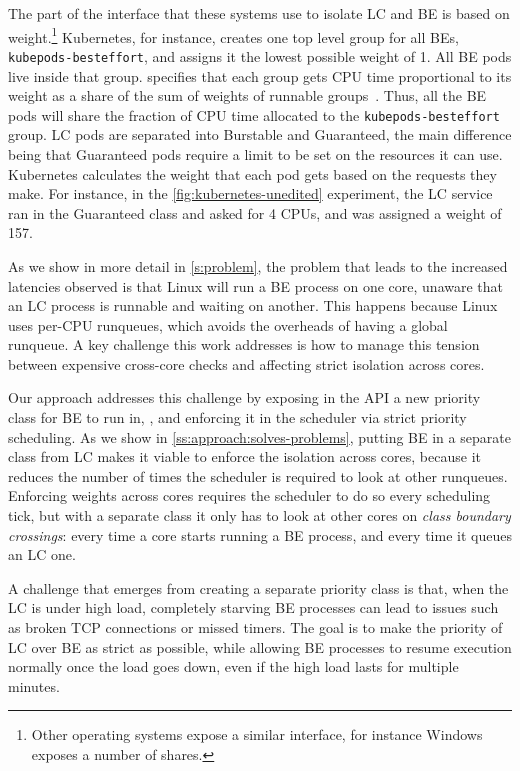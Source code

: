 The part of the \cgroups{} interface that these systems use to isolate LC and BE
is based on weight.\footnote{Other operating systems expose a similar interface,
for instance Windows exposes a number of shares.} Kubernetes, for instance,
creates one top level group for all BEs, \texttt{kubepods-besteffort}, and
assigns it the lowest possible weight of 1. All BE pods live inside that group.
\cgroups{} specifies that each group gets CPU time proportional to its weight as
a share of the sum of weights of runnable groups~\cite{cgroups-kerneldocs}.
Thus, all the BE pods will share the fraction of CPU time allocated to the
\texttt{kubepods-besteffort} group. LC pods are separated into Burstable and
Guaranteed, the main difference being that Guaranteed pods require a limit to be
set on the resources it can use. Kubernetes calculates the weight that each pod
gets based on the requests they make. For instance, in the
\autoref{fig:kubernetes-unedited} experiment, the LC service ran in the
Guaranteed class and asked for 4 CPUs, and was assigned a weight of 157. 

As we show in more detail in \autoref{s:problem}, the problem that leads to the
increased latencies observed is that Linux will run a BE process on one core,
unaware that an LC process is runnable and waiting on another. This happens
because Linux uses per-CPU runqueues, which avoids the overheads of having a
global runqueue. A key challenge this work addresses is how to manage this
tension between expensive cross-core checks and affecting strict isolation
across cores.

Our approach addresses this challenge by exposing in the API a new priority
class for BE to run in, \beclass{}, and enforcing it in the scheduler via strict
priority scheduling. As we show in \autoref{ss:approach:solves-problems},
putting BE in a separate class from LC makes it viable to enforce the isolation
across cores, because it reduces the number of times the scheduler is required
to look at other runqueues. Enforcing weights across cores requires the
scheduler to do so every scheduling tick, but with a separate class it only has
to look at other cores on \textit{class boundary crossings}: every time a core
starts running a BE process, and every time it queues an LC one.

A challenge that emerges from creating a separate priority class is that, when
the LC is under high load, completely starving BE processes can lead to issues
such as broken TCP connections or missed timers. The goal is to make the
priority of LC over BE as strict as possible, while allowing BE processes to
resume execution normally once the load goes down, even if the high load lasts
for multiple minutes.

